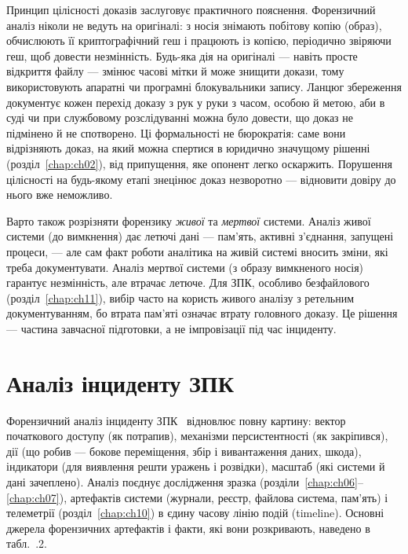 Принцип цілісності доказів заслуговує практичного пояснення. Форензичний аналіз ніколи не ведуть на оригіналі: з носія знімають побітову копію (образ), обчислюють її криптографічний геш і працюють із копією, періодично звіряючи геш, щоб довести незмінність. Будь-яка дія на оригіналі --- навіть просте відкриття файлу --- змінює часові мітки й може знищити докази, тому використовують апаратні чи програмні блокувальники запису. Ланцюг збереження документує кожен перехід доказу з рук у руки з часом, особою й метою, аби в суді чи при службовому розслідуванні можна було довести, що доказ не підмінено й не спотворено. Ці формальності не бюрократія: саме вони відрізняють доказ, на який можна спертися в юридично значущому рішенні (розділ~\ref{chap:ch02}), від припущення, яке опонент легко оскаржить. Порушення цілісності на будь-якому етапі знецінює доказ незворотно --- відновити довіру до нього вже неможливо.

Варто також розрізняти форензику \emph{живої} та \emph{мертвої} системи. Аналіз живої системи (до вимкнення) дає летючі дані --- пам'ять, активні з'єднання, запущені процеси, --- але сам факт роботи аналітика на живій системі вносить зміни, які треба документувати. Аналіз мертвої системи (з образу вимкненого носія) гарантує незмінність, але втрачає летюче. Для ЗПК, особливо безфайлового (розділ~\ref{chap:ch11}), вибір часто на користь живого аналізу з ретельним документуванням, бо втрата пам'яті означає втрату головного доказу. Це рішення --- частина завчасної підготовки, а не імпровізації під час інциденту.

\section{Аналіз інциденту ЗПК}\label{sec:ch16-analysis}

Форензичний аналіз інциденту ЗПК~\cite{ch16:forensic-ua} відновлює повну картину: вектор початкового доступу (як потрапив), механізми персистентності (як закріпився), дії (що робив --- бокове переміщення, збір і вивантаження даних, шкода), індикатори (для виявлення решти уражень і розвідки), масштаб (які системи й дані зачеплено). Аналіз поєднує дослідження зразка (розділи~\ref{chap:ch06}--\ref{chap:ch07}), артефактів системи (журнали, реєстр, файлова система, пам'ять) і телеметрії (розділ~\ref{chap:ch10}) в єдину часову лінію подій (timeline). Основні джерела форензичних артефактів і факти, які вони розкривають, наведено в табл.~\thechapter.2.


